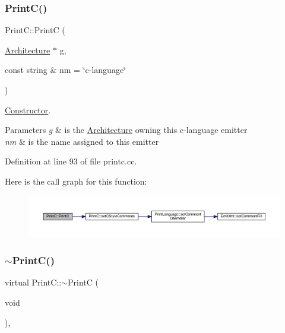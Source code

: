 \subsubsection{\texorpdfstring{PrintC()}{PrintC()}}
{\footnotesize\ttfamily Print\+C\+::\+PrintC (\begin{DoxyParamCaption}\item[{\mbox{\hyperlink{class_architecture}{Architecture}} $\ast$}]{g,  }\item[{const string \&}]{nm = {\ttfamily \char`\"{}c-\/language\char`\"{}} }\end{DoxyParamCaption})}



\mbox{\hyperlink{class_constructor}{Constructor}}. 


\begin{DoxyParams}{Parameters}
{\em g} & is the \mbox{\hyperlink{class_architecture}{Architecture}} owning this c-\/language emitter \\
\hline
{\em nm} & is the name assigned to this emitter \\
\hline
\end{DoxyParams}


Definition at line 93 of file printc.\+cc.

Here is the call graph for this function\+:
\nopagebreak
\begin{figure}[H]
\begin{center}
\leavevmode
\includegraphics[width=350pt]{class_print_c_afd4f48f7193a4586ad4b6a01c8f60bc9_cgraph}
\end{center}
\end{figure}
\mbox{\label{class_print_c_a58177f1ce307faee2788320fe36dda6e}} 
\subsubsection{\texorpdfstring{$\sim$PrintC()}{~PrintC()}}
{\footnotesize\ttfamily virtual Print\+C\+::$\sim$\+PrintC (\begin{DoxyParamCaption}\item[{void}]{ }\end{DoxyParamCaption})\hspace{0.3cm}{\ttfamily [inline]}, {\ttfamily [virtual]}}




